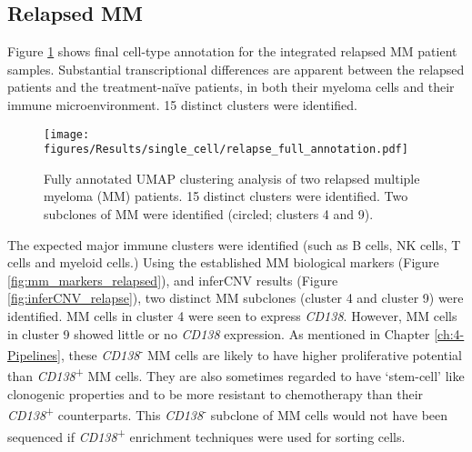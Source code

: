 \subsection{Relapsed MM}
Figure \ref{fig:full_anno_relapse} shows final cell-type annotation for the integrated relapsed MM patient samples.
Substantial transcriptional differences are apparent between the relapsed patients and the treatment-na\"ive patients, in both their myeloma cells and their immune microenvironment.
15 distinct clusters were identified.
\begin{figure}[hpt]
\centering
\texttt{[image: figures/Results/single\_cell/relapse\_full\_annotation.pdf]}
\caption[scRNA-seq full annotation- relapsed MM]{Fully annotated UMAP clustering analysis of two relapsed multiple myeloma (MM) patients.
15 distinct clusters were identified.
Two subclones of MM were identified (circled; clusters 4 and 9).}
\label{fig:full_anno_relapse}
\end{figure}
The expected major immune clusters were identified (such as B cells, NK cells, T cells and myeloid cells.)
Using the established MM biological markers (Figure \ref{fig:mm_markers_relapsed}), and inferCNV results (Figure \ref{fig:inferCNV_relapse}), two distinct MM subclones (cluster 4 and cluster 9) were identified.
MM cells in cluster 4 were seen to express \textit{CD138}.
However, MM cells in cluster 9 showed little or no \textit{CD138} expression.
As mentioned in Chapter \ref{ch:4-Pipelines}, these \textit{CD138}\textsuperscript{-} MM cells are likely to have higher proliferative potential than \textit{CD138}\textsuperscript{+} MM cells.
They are also sometimes regarded to have `stem-cell' like clonogenic properties and to be more resistant to chemotherapy than their \textit{CD138}\textsuperscript{+} counterparts\cite{setiadi2019cd138}.
This \textit{CD138}\textsuperscript{-} subclone of MM cells would not have been sequenced if \textit{CD138}\textsuperscript{+} enrichment techniques were used for sorting cells.

